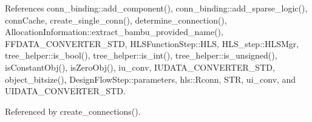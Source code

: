 References conn\+\_\+binding\+::add\+\_\+component(), conn\+\_\+binding\+::add\+\_\+sparse\+\_\+logic(), conn\+Cache, create\+\_\+single\+\_\+conn(), determine\+\_\+connection(), Allocation\+Information\+::extract\+\_\+bambu\+\_\+provided\+\_\+name(), F\+F\+D\+A\+T\+A\+\_\+\+C\+O\+N\+V\+E\+R\+T\+E\+R\+\_\+\+S\+TD, H\+L\+S\+Function\+Step\+::\+H\+LS, H\+L\+S\+\_\+step\+::\+H\+L\+S\+Mgr, tree\+\_\+helper\+::is\+\_\+bool(), tree\+\_\+helper\+::is\+\_\+int(), tree\+\_\+helper\+::is\+\_\+unsigned(), is\+Constant\+Obj(), is\+Zero\+Obj(), iu\+\_\+conv, I\+U\+D\+A\+T\+A\+\_\+\+C\+O\+N\+V\+E\+R\+T\+E\+R\+\_\+\+S\+TD, object\+\_\+bitsize(), Design\+Flow\+Step\+::parameters, hls\+::\+Rconn, S\+TR, ui\+\_\+conv, and U\+I\+D\+A\+T\+A\+\_\+\+C\+O\+N\+V\+E\+R\+T\+E\+R\+\_\+\+S\+TD.



Referenced by create\+\_\+connections().

